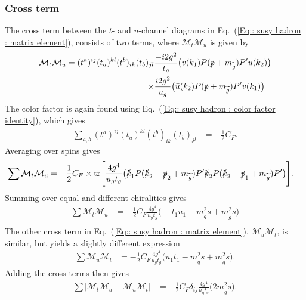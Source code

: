 \documentclass[twoside,english]{uiofysmaster}
\begin{document}
{\subsubsection{Cross term}
The cross term between the $t$- and $u$-channel diagrams in Eq.~(\ref{Eq:: susy hadron : matrix element}), consists of two terms, where $\mathcal{M}_t \mathcal{M}_u$ is given by
\begin{align*}
\mathcal{M}_t \mathcal{M}_u = (t^a)^{ij}(t_a)^{kl}(t^b)_{ik}(t_b)_{jl} &\frac{-i 2 g^2}{t_g}\big( \bar{v} (k_1)  P (\slashed{p} + m_{\widetilde{g}}) P'u(k_2) \big) \\ \times& \frac{i 2 g^2}{u_g} \big( \bar{u} (k_2)  P (\slashed{p} + m_{\widetilde{g}}) P' v(k_1) \big)\\
\end{align*}
The color factor is again found using Eq.~(\ref{Eq:: susy hadron : color factor identity}), which gives
\begin{align*}
\sum_{a,b}(t^a)^{ij}(t_a)^{kl}(t^b)_{ik}(t_b)_{jl} 
 &= - \frac{1}{2}C_F.
\end{align*}
Averaging over spins gives
\begin{align*}
\sum \mathcal{M}_t \mathcal{M}_u &= - \frac{1}{2}C_F \times \text{tr}\Bigg[ \frac{4 g^4}{u_gt_g}\big( \slashed{k}_1   P (\slashed{k}_2 - \slashed{p}_2 + m_{\widetilde{g}}) P'\slashed{k}_2  P (\slashed{k}_2 -\slashed{p}_1 + m_{\widetilde{g}}) P' \big) \Bigg].
\end{align*}
Summing over equal and different chiralities gives
\begin{align*}
\sum \mathcal{M}_t \mathcal{M}_u 
  &= - \frac{1}{2}C_F  \frac{4 g^4}{u_gt_g} \big(
  -   t_1 u_1 + m_{\widetilde{q}}^2 s 
+  m_{\widetilde{g}}^2 s
  \big)\\
\end{align*}
The other cross term in Eq.~(\ref{Eq:: susy hadron : matrix element}),  $\mathcal{M}_u \mathcal{M}_t$, is similar, but yields a slightly different expression
\begin{align*}
\sum \mathcal{M}_u \mathcal{M}_t
  &= - \frac{1}{2}C_F  \frac{4 g^4}{u_gt_g} \big(
u_1t_1- m_{\widetilde{q}}^2s + m_{\widetilde{g}}^2s
  \big).
\end{align*}
Adding the cross terms then gives 
\begin{align*}
\sum |\mathcal{M}_t \mathcal{M}_u + \mathcal{M}_u \mathcal{M}_t| &= - \frac{1}{2}C_F \delta_{ij}  \frac{4 g^4}{u_gt_g} \big(2 m_{\widetilde{g}}^2s   \big).
\end{align*}


}
\end{document}
